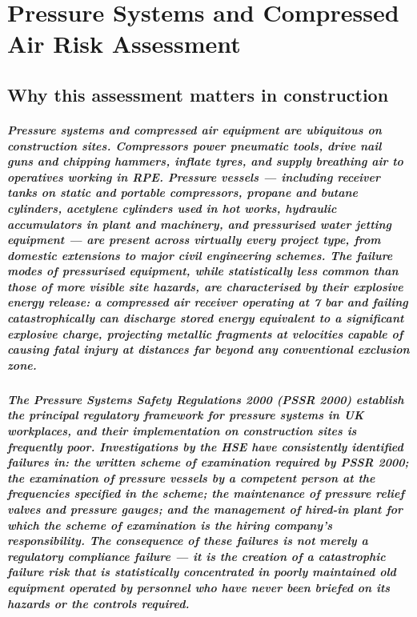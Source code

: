 \chapter{Pressure Systems and Compressed Air Risk Assessment}
\label{chap:Pressure Systems and Compressed Air Risk Assessment}

\section{Why this assessment matters in construction}

\paragraph{Pressure systems and compressed air equipment are ubiquitous on construction sites. Compressors power pneumatic tools, drive nail guns and chipping hammers, inflate tyres, and supply breathing air to operatives working in RPE. Pressure vessels --- including receiver tanks on static and portable compressors, propane and butane cylinders, acetylene cylinders used in hot works, hydraulic accumulators in plant and machinery, and pressurised water jetting equipment --- are present across virtually every project type, from domestic extensions to major civil engineering schemes. The failure modes of pressurised equipment, while statistically less common than those of more visible site hazards, are characterised by their explosive energy release: a compressed air receiver operating at 7 bar and failing catastrophically can discharge stored energy equivalent to a significant explosive charge, projecting metallic fragments at velocities capable of causing fatal injury at distances far beyond any conventional exclusion zone.}

\paragraph{The Pressure Systems Safety Regulations 2000 (PSSR 2000) establish the principal regulatory framework for pressure systems in UK workplaces, and their implementation on construction sites is frequently poor. Investigations by the HSE have consistently identified failures in: the written scheme of examination required by PSSR 2000; the examination of pressure vessels by a competent person at the frequencies specified in the scheme; the maintenance of pressure relief valves and pressure gauges; and the management of hired-in plant for which the scheme of examination is the hiring company's responsibility. The consequence of these failures is not merely a regulatory compliance failure --- it is the creation of a catastrophic failure risk that is statistically concentrated in poorly maintained old equipment operated by personnel who have never been briefed on its hazards or the controls required.}

